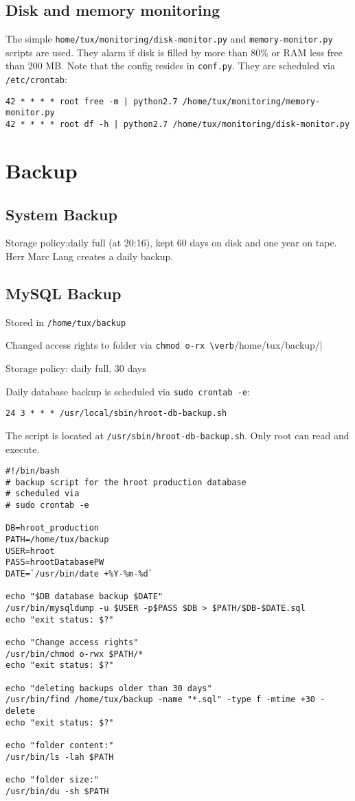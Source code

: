 \documentclass{article}
\begin{document}
\subsection{Disk and memory monitoring}
The simple \verb|home/tux/monitoring/disk-monitor.py| and \verb|memory-monitor.py| scripts are used.
They alarm if disk is filled by more than 80\% or RAM less free than 200 MB.
Note that the config resides in \verb|conf.py|.
They are scheduled via \verb|/etc/crontab|:
\begin{lstlisting}
42 * * * * root free -m | python2.7 /home/tux/monitoring/memory-monitor.py
42 * * * * root df -h | python2.7 /home/tux/monitoring/disk-monitor.py
\end{lstlisting}

\section{Backup}
\subsection{System Backup}
Storage policy:daily full (at 20:16), kept 60 days on disk and one year on tape.
Herr Marc Lang creates a daily backup.

\subsection{MySQL Backup}
Stored in \verb|/home/tux/backup|

Changed access rights to folder via \verb|chmod o-rx \verb|/home/tux/backup/|

Storage policy: daily full, 30 days

Daily database backup is scheduled via \verb|sudo crontab -e|:
\begin{lstlisting}   
24 3 * * * /usr/local/sbin/hroot-db-backup.sh 
\end{lstlisting}

The script is located at \verb|/usr/sbin/hroot-db-backup.sh|. Only root can read and execute.
\begin{lstlisting}
#!/bin/bash
# backup script for the hroot production database
# scheduled via
# sudo crontab -e

DB=hroot_production
PATH=/home/tux/backup
USER=hroot
PASS=hrootDatabasePW
DATE=`/usr/bin/date +%Y-%m-%d`

echo "$DB database backup $DATE" 
/usr/bin/mysqldump -u $USER -p$PASS $DB > $PATH/$DB-$DATE.sql
echo "exit status: $?" 

echo "Change access rights"
/usr/bin/chmod o-rwx $PATH/*
echo "exit status: $?"

echo "deleting backups older than 30 days"
/usr/bin/find /home/tux/backup -name "*.sql" -type f -mtime +30 -delete
echo "exit status: $?" 

echo "folder content:"
/usr/bin/ls -lah $PATH

echo "folder size:"
/usr/bin/du -sh $PATH
\end{lstlisting}
\end{document}
